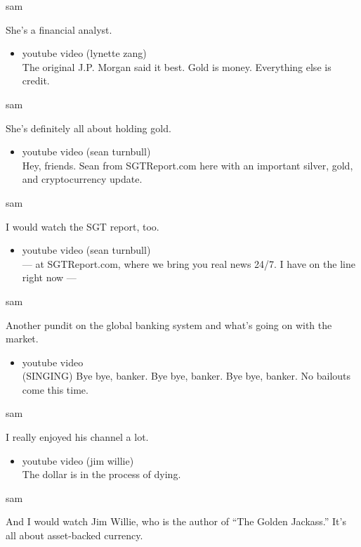 sam

She's a financial analyst.

\begin{itemize}
\tightlist
\item
  youtube video (lynette zang)\\
  The original J.P. Morgan said it best. Gold is money. Everything else
  is credit.
\end{itemize}

sam

She's definitely all about holding gold.

\begin{itemize}
\tightlist
\item
  youtube video (sean turnbull)\\
  Hey, friends. Sean from SGTReport.com here with an important silver,
  gold, and cryptocurrency update.
\end{itemize}

sam

I would watch the SGT report, too.

\begin{itemize}
\tightlist
\item
  youtube video (sean turnbull)\\
  --- at SGTReport.com, where we bring you real news 24/7. I have on the
  line right now ---
\end{itemize}

sam

Another pundit on the global banking system and what's going on with the
market.

\begin{itemize}
\tightlist
\item
  youtube video\\
  (SINGING) Bye bye, banker. Bye bye, banker. Bye bye, banker. No
  bailouts come this time.
\end{itemize}

sam

I really enjoyed his channel a lot.

\begin{itemize}
\tightlist
\item
  youtube video (jim willie)\\
  The dollar is in the process of dying.
\end{itemize}

sam

And I would watch Jim Willie, who is the author of ``The Golden
Jackass.'' It's all about asset-backed currency.

